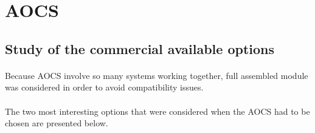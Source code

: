 \section{AOCS} \label{Appendix:AOCS}

\subsection{Study of the commercial available options}

\paragraph{} Because AOCS involve so many systems working together, full assembled module was considered in order to avoid compatibility issues. 


\paragraph{}The two most interesting options that were considered when the AOCS had to be chosen are presented below.

